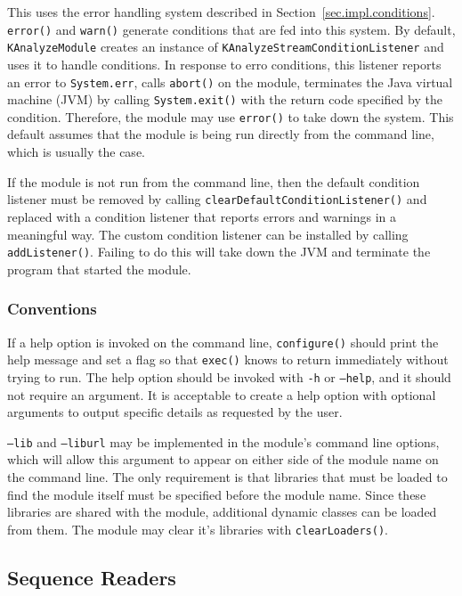 This uses the error handling system described in Section~\ref{sec.impl.conditions}. \texttt{error()} and \texttt{warn()} generate conditions that are fed into this system. By default, \texttt{KAnalyzeModule} creates an instance of \texttt{KAnalyzeStreamConditionListener} and uses it to handle conditions. In response to erro conditions, this listener reports an error to \texttt{System.err}, calls \texttt{abort()} on the module, terminates the Java virtual machine (JVM) by calling \texttt{System.exit()} with the return code specified by the condition. Therefore, the module may use \texttt{error()} to take down the system. This default assumes that the module is being run directly from the command line, which is usually the case.

If the module is not run from the command line, then the default condition listener must be removed by calling \texttt{clearDefaultConditionListener()} and replaced with a condition listener that reports errors and warnings in a meaningful way. The custom condition listener can be installed by calling \texttt{addListener()}. Failing to do this will take down the JVM and terminate the program that started the module.

\subsubsection{Conventions}
\label{sec.ext.mod.conventions}

If a help option is invoked on the command line, \texttt{configure()} should print the help message and set a flag so that \texttt{exec()} knows to return immediately without trying to run. The help option should be invoked with \texttt{-h} or \texttt{--help}, and it should not require an argument. It is acceptable to create a help option with optional arguments to output specific details as requested by the user.

\texttt{--lib} and \texttt{--liburl} may be implemented in the module's command line options, which will allow this argument to appear on either side of the module name on the command line. The only requirement is that libraries that must be loaded to find the module itself must be specified before the module name. Since these libraries are shared with the module, additional dynamic classes can be loaded from them. The module may clear it's libraries with \texttt{clearLoaders()}.


\subsection{Sequence Readers}
\label{sec.ext.readers}


